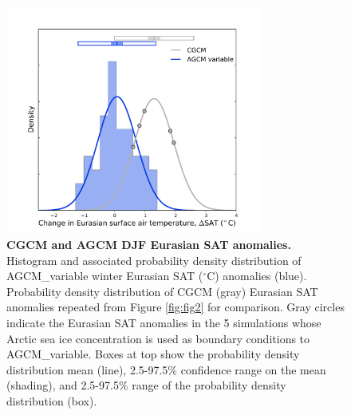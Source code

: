 \documentclass{nature}
\begin{document}
\begin{figure}%
\centering
\noindent\includegraphics[width=20pc]{Word/Figure_3.pdf}
\caption{\textbf{CGCM and AGCM DJF Eurasian SAT anomalies.} Histogram and associated probability density distribution of AGCM\_variable winter Eurasian SAT ($^\circ$C) anomalies (blue). Probability density distribution of CGCM (gray) Eurasian SAT anomalies repeated from Figure \ref{fig:fig2} for comparison. Gray circles indicate the Eurasian SAT anomalies in the 5 simulations whose Arctic sea ice concentration is used as boundary conditions to AGCM\_variable. Boxes at top show the probability density distribution mean (line), 2.5-97.5\% confidence range on the mean (shading), and 2.5-97.5\% range of the probability density distribution (box).
} %
\label{fig:fig3} 
\end{figure}
\end{document}

